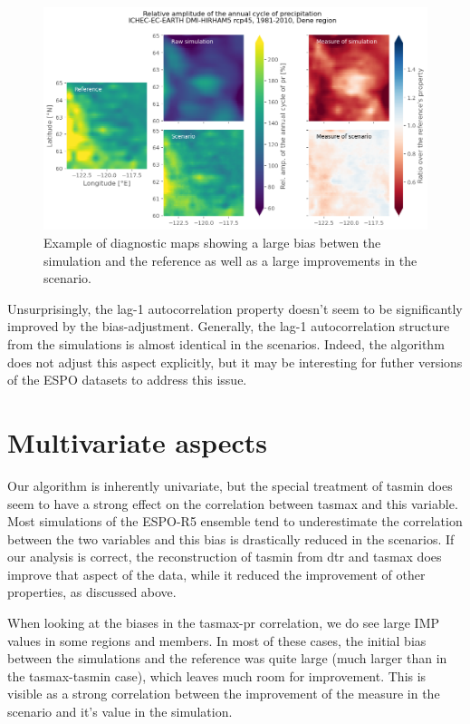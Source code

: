 \documentclass[letterpaper,10pt]{article}
\begin{document}
\begin{figure}
\includegraphics[width=\textwidth]{../images/aca_pr_diags.png}
\caption{Example of diagnostic maps showing a large bias betwen the simulation and the reference as well as a large improvements in the scenario.}\label{fig:acapr}
\end{figure}


Unsurprisingly, the lag-1 autocorrelation property doesn't seem to be significantly improved by the bias-adjustment. Generally, the lag-1 autocorrelation structure from the simulations is almost identical in the scenarios. Indeed, the algorithm does not adjust this aspect explicitly, but it may be interesting for futher versions of the ESPO datasets to address this issue.

\section{Multivariate aspects}
Our algorithm is inherently univariate, but the special treatment of tasmin does seem to have a strong effect on the correlation between tasmax and this variable. Most simulations of the ESPO-R5 ensemble tend to underestimate the correlation between the two variables and this bias is drastically reduced in the scenarios. If our analysis is correct, the reconstruction of tasmin from dtr and tasmax does improve that aspect of the data, while it reduced the improvement of other properties, as discussed above.

When looking at the biases in the tasmax-pr correlation, we do see large IMP values in some regions and members. In most of these cases, the initial bias between the simulations and the reference was quite large (much larger than in the tasmax-tasmin case), which leaves much room for improvement. This is visible as a strong correlation between the improvement of the measure in the scenario and it's value in the simulation.
\end{document}
